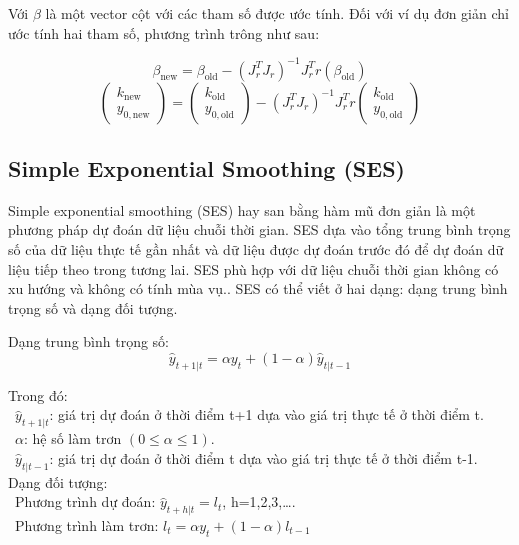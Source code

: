 \documentclass[conference]{IEEEtran}
\begin{document}
Với \(\beta\) là một vector cột với các tham số được ước tính. Đối với ví dụ đơn giản chỉ ước tính hai tham số, phương trình trông như sau:

\begin{center}
    \[
        \beta_{\text{new}} = \beta_{\text{old}} - (J^T_r J_r)^{-1} J^T_r r(\beta_{\text{old}})
    \]
    \[
        \begin{pmatrix}
            k_{\text{new}} \\ y_{0,\text{new}}
        \end{pmatrix} =
        \begin{pmatrix}
            k_{\text{old}} \\ y_{0,\text{old}}
        \end{pmatrix} - (J^T_r J_r)^{-1} J^T_r r \begin{pmatrix}
            k_{\text{old}} \\ y_{0,\text{old}}
        \end{pmatrix}
    \]
\end{center}
\vspace{3mm}


\subsection{Simple Exponential Smoothing (SES)}
Simple exponential smoothing (SES) hay san bằng hàm mũ đơn giản là một phương pháp dự đoán dữ liệu chuỗi thời gian. SES dựa vào tổng trung bình trọng số của dữ liệu thực tế gần nhất và dữ liệu được dự đoán trước đó để dự đoán dữ liệu tiếp theo trong tương lai. SES phù hợp với dữ liệu chuỗi thời gian không có xu hướng và không có tính mùa vụ.. SES có thể viết ở hai dạng: dạng trung bình trọng số và dạng đối tượng.

Dạng trung bình trọng số:
\[\hat{y}_{t+1|t} = \alpha y_t + (1-\alpha)\hat{y}_{t|t-1}\]

Trong đó:\\
\indent\textbullet\ \(\hat{y}_{t+1|t} \): giá trị dự đoán ở thời điểm t+1 dựa vào giá trị thực tế ở thời điểm t.\\
\indent\textbullet\ \(\alpha\): hệ số làm trơn \((0\le\alpha\le1)\).\\
\indent\textbullet\ \(\hat{y}_{t|t-1} \): giá trị dự đoán ở thời điểm t dựa vào giá trị thực tế ở thời điểm  t-1.\\

Dạng đối tượng:\\
\indent\textbullet\ Phương trình dự đoán: \(\hat{y}_{t+h|t}=l_t\), h=1,2,3,\dots.\\
\indent\textbullet\ Phương trình làm trơn: \(l_t=\alpha y_t+(1-\alpha)l_{t-1}\)\\
\end{document}
